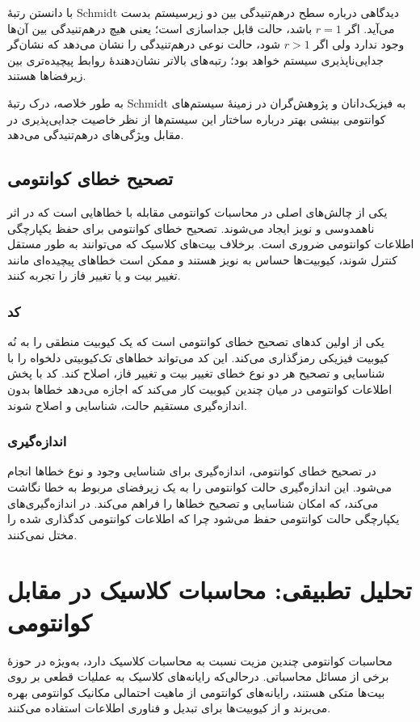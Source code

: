 با دانستن رتبهٔ Schmidt دیدگاهی درباره سطح درهم‌تنیدگی بین دو زیرسیستم بدست می‌آید. اگر \(r = 1\) باشد، حالت قابل جداسازی است؛ یعنی هیچ درهم‌تنیدگی بین آن‌ها وجود ندارد ولی اگر \(r > 1\) شود، حالت نوعی درهم‌تنیدگی را نشان می‌دهد که نشان‌گر جدایی‌ناپذیری سیستم خواهد بود؛ رتبه‌های بالاتر نشان‌دهندهٔ روابط پیچیده‌تری بین زیرفضاها هستند.

به طور خلاصه، درک رتبهٔ Schmidt به فیزیک‌دانان و پژوهش‌گران در زمینهٔ سیستم‌های کوانتومی بینشی بهتر درباره ساختار این سیستم‌ها از نظر خاصیت جدایی‌پذیری در مقابل ویژگی‌های درهم‌تنیدگی می‌دهد.

\subsection{تصحیح خطای کوانتومی}
یکی از چالش‌های اصلی در محاسبات کوانتومی مقابله با خطاهایی است که در اثر ناهمدوسی و نویز ایجاد می‌شوند. تصحیح خطای کوانتومی برای حفظ یکپارچگی اطلاعات کوانتومی ضروری است. برخلاف بیت‌های کلاسیک که می‌توانند به طور مستقل کنترل شوند، کیوبیت‌ها حساس به نویز هستند و ممکن است خطاهای پیچیده‌ای مانند تغییر بیت و یا تغییر فاز را تجربه کنند.

\subsubsection{کد }
یکی از اولین کدهای تصحیح خطای کوانتومی است که یک کیوبیت منطقی را به نُه کیوبیت فیزیکی رمزگذاری می‌کند. این کد می‌تواند خطاهای تک‌کیوبیتی دلخواه را با شناسایی و تصحیح هر دو نوع خطای تغییر بیت و تغییر فاز، اصلاح کند. کد با پخش اطلاعات کوانتومی در میان چندین کیوبیت کار می‌کند که اجازه می‌دهد خطاها بدون اندازه‌گیری مستقیم حالت، شناسایی و اصلاح شوند.
\subsubsection{اندازه‌گیری }
در تصحیح خطای کوانتومی، اندازه‌گیری  برای شناسایی وجود و نوع خطاها انجام می‌شود. این اندازه‌گیری حالت کوانتومی را به یک زیرفضای مربوط به  خطا نگاشت می‌کند، که امکان شناسایی و تصحیح خطاها را فراهم می‌کند. در اندازه‌گیری‌های  یکپارچگی حالت کوانتومی حفظ می‌شود چرا که اطلاعات کوانتومی کدگذاری شده را مختل نمی‌کنند.

\section{تحلیل تطبیقی: محاسبات کلاسیک در مقابل کوانتومی}
محاسبات کوانتومی چندین مزیت نسبت به محاسبات کلاسیک دارد، به‌ویژه در حوزهٔ برخی از مسائل محاسباتی. درحالی‌که رایانه‌های کلاسیک به عملیات قطعی بر روی بیت‌ها متکی هستند، رایانه‌های کوانتومی از ماهیت احتمالی مکانیک کوانتومی بهره می‌برند و از کیوبیت‌ها برای تبدیل و فناوری اطلاعات استفاده می‌کنند.

